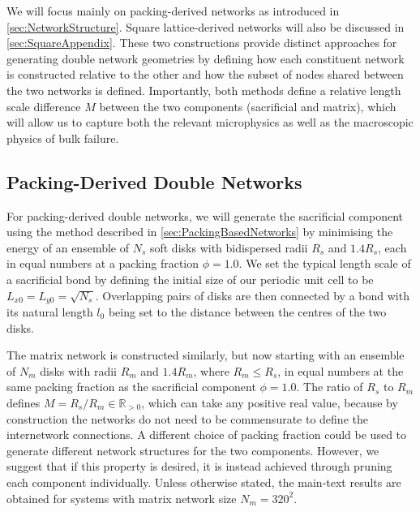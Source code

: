 \documentclass[asymmetricmargins]{library/duthesis}%
\begin{document}
We will focus mainly on packing-derived networks as introduced in \cref{sec:NetworkStructure}. Square lattice-derived networks will also be discussed in \cref{sec:SquareAppendix}. These two constructions provide distinct approaches for generating double network geometries by defining how each constituent network is constructed relative to the other and how the subset of nodes shared between the two networks is defined. Importantly, both methods define a relative length scale difference $M$ between the two components (sacrificial and matrix), which will allow us to capture both the relevant microphysics as well as the macroscopic physics of bulk failure. 

\subsection{Packing-Derived Double Networks}
For packing-derived double networks, we will generate the sacrificial component using the method described in \cref{sec:PackingBasedNetworks} by minimising the energy of an ensemble of $N_s$ soft disks with bidispersed radii $R_s$ and $1.4R_s$, each in equal numbers at a packing fraction $\phi = 1.0$. We set the typical length scale of a sacrificial bond by defining the initial size of our periodic unit cell to be $L_{x0} = L_{y0} = \sqrt{N_s}$. Overlapping pairs of disks are then connected by a bond with its natural length $l_0$ being set to the distance between the centres of the two disks. 

The matrix network is constructed similarly, but now starting with an ensemble of $N_m$ disks with radii $R_m$ and $1.4R_m$, where $R_m \leq R_s$, in equal numbers at the same packing fraction as the sacrificial component $\phi = 1.0$. The ratio of $R_s$ to $R_m$ defines $M = R_s / R_m \in \mathbb{R}_{>0}$, which can take any positive real value, because by construction the networks do not need to be commensurate to define the internetwork connections. A different choice of packing fraction could be used to generate different network structures for the two components. However, we suggest that if this property is desired, it is instead achieved through pruning each component individually. Unless otherwise stated, the main-text results are obtained for systems with matrix network size $N_m = 320^2$.
\end{document}
